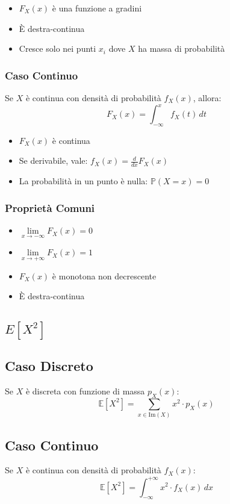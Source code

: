 \documentclass{article}
\begin{document}
\begin{itemize}
  \item $F_X(x)$ è una funzione a gradini
  \item È destra-continua
  \item Cresce solo nei punti $x_i$ dove $X$ ha massa di probabilità
\end{itemize}

\subsubsection*{Caso Continuo}
Se $X$ è continua con densità di probabilità $f_X(x)$, allora:
\[
F_X(x) = \int_{-\infty}^{x} f_X(t) \, dt
\]

\begin{itemize}
  \item $F_X(x)$ è continua
  \item Se derivabile, vale: $f_X(x) = \frac{d}{dx}F_X(x)$
  \item La probabilità in un punto è nulla: $\mathbb{P}(X = x) = 0$
\end{itemize}

\subsubsection*{Proprietà Comuni}
\begin{itemize}
  \item $\lim\limits_{x \to -\infty} F_X(x) = 0$
  \item $\lim\limits_{x \to +\infty} F_X(x) = 1$
  \item $F_X(x)$ è monotona non decrescente
  \item È destra-continua
\end{itemize}

\subsection*{${E}[X^2]$}

\subsection*{Caso Discreto}
Se $X$ è discreta con funzione di massa $p_X(x)$:
\[
\mathbb{E}[X^2] = \sum_{x \in \text{Im}(X)} x^2 \cdot p_X(x)
\]

\subsection*{Caso Continuo}
Se $X$ è continua con densità di probabilità $f_X(x)$:
\[
\mathbb{E}[X^2] = \int_{-\infty}^{+\infty} x^2 \cdot f_X(x) \, dx
\]
\end{document}
